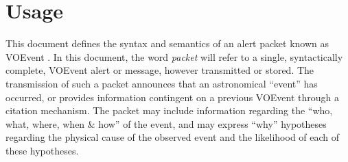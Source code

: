 \documentclass[11pt,a4paper]{ivoa}
\begin{document}
\section{Usage}
\label{sec:2}
This document defines the syntax and semantics of an alert packet known as
VOEvent \citep{2011ivoa.spec.0711S}. In this document, the word \emph{packet}
will refer to a single, syntactically complete, VOEvent alert or message,
however transmitted or stored. The transmission of such a packet announces that
an astronomical ``event'' has occurred, or provides information contingent on a
previous VOEvent through a citation mechanism. The packet may include
information regarding the ``who, what, where, when \& how'' of the event, and
may express ``why'' hypotheses regarding the physical cause of the observed
event and the likelihood of each of these hypotheses.
\end{document}
